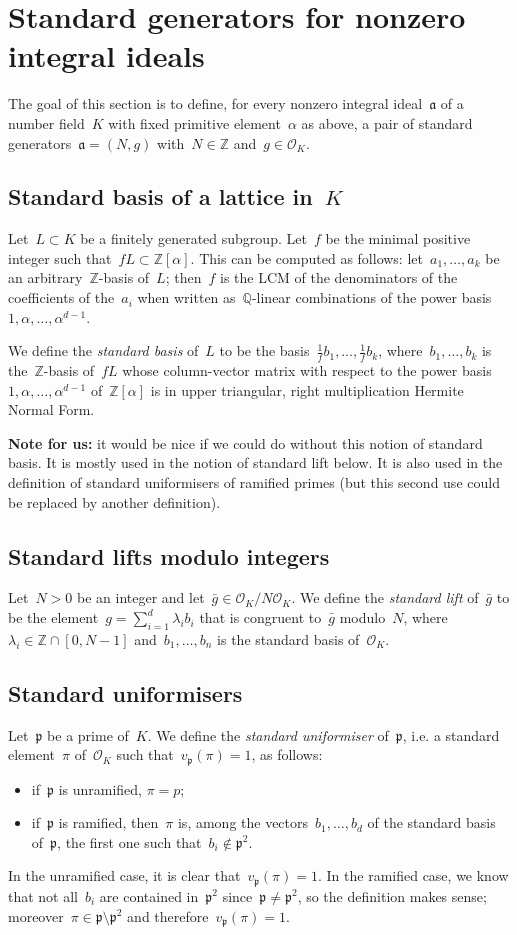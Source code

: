 \documentclass{article}
\def\Z{{\mathbb Z}}
\def\Q{{\mathbb Q}}
\def\OO{{\mathcal O}}
\def\a{{\mathfrak a}}
\def\p{{\mathfrak p}}
\begin{document}
\section{Standard generators for nonzero integral ideals}

The goal of this section is to define, for every nonzero integral ideal~$\a$ of
a number field~$K$ with fixed primitive element~$\alpha$ as above, a pair of
standard generators~$\a = (N,g)$ with~$N\in\Z$ and~$g\in\OO_K$.

\subsection{Standard basis of a lattice in~$K$}
Let~$L\subset K$ be a finitely generated subgroup. Let~$f$ be the minimal
positive integer such that~$f L \subset \Z[\alpha]$. This can be computed as
follows: let~$a_1,\dots,a_k$ be an arbitrary~$\Z$-basis of~$L$; then~$f$ is the
LCM of the denominators of the coefficients of the~$a_i$ when written
as~$\Q$-linear combinations of the power basis~$1,\alpha,\dots,\alpha^{d-1}$.

We define the \emph{standard basis} of~$L$ to be the
basis~$\frac{1}{f}b_1,\dots,\frac{1}{f}b_k$, where~$b_1,\dots,b_k$ is
the~$\Z$-basis of~$fL$ whose column-vector matrix with respect to the power
basis~$1,\alpha,\dots,\alpha^{d-1}$ of~$\Z[\alpha]$ is in upper triangular,
right multiplication Hermite Normal Form.

\textbf{Note for us:} it would be nice if we could do without this notion of standard
basis. It is mostly used in the notion of standard lift below. It is also used in the
definition of standard uniformisers of ramified primes (but this second use
could be replaced by another definition).

\subsection{Standard lifts modulo integers}
Let~$N>0$ be an integer and let~$\bar{g}\in\OO_K/N\OO_K$. We define the \emph{standard
lift} of~$\bar{g}$ to be the element~$g = \sum_{i=1}^d \lambda_i b_i$ that is
congruent to~$\bar{g}$ modulo~$N$, where~$\lambda_i\in \Z\cap [0,N-1]$
and~$b_1,\dots,b_n$ is the standard basis of~$\OO_K$.

\subsection{Standard uniformisers}
Let~$\p$ be a prime of~$K$. We define the \emph{standard uniformiser} of~$\p$,
i.e. a standard element~$\pi$ of~$\OO_K$ such that~$v_\p(\pi)=1$, as follows:
\begin{itemize}
  \item if~$\p$ is unramified, $\pi=p$;
  \item if~$\p$ is ramified, then~$\pi$ is, among the vectors~$b_1,\dots,b_d$ of
    the standard basis of~$\p$, the first one such that~$b_i\notin\p^2$.
\end{itemize}
In the unramified case, it is clear that~$v_\p(\pi)=1$. In the ramified case, we
know that not all~$b_i$ are contained in~$\p^2$ since~$\p\neq\p^2$, so the
definition makes sense; moreover~$\pi \in\p\setminus\p^2$ and
therefore~$v_\p(\pi)=1$.
\end{document}
